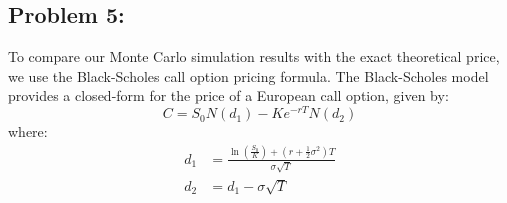 \documentclass{report}
\begin{document}
\pagebreak
\[
\]








\subsection*{Problem 5:}
To compare our Monte Carlo simulation results with the exact theoretical price, we use the Black-Scholes call option pricing formula. The Black-Scholes model provides a closed-form for the price of a European call option, given by:
\[
C=S_0N(d_1)-Ke^{-rT}N(d_2)
\]
where:
\begin{align*}
d_1 &= \frac{\ln(\frac{S_0}{K}) + (r+\frac{1}{2}\sigma^2)T}{\sigma\sqrt{T}} \\
d_2 &= d_1 -\sigma\sqrt{T}
\end{align*}
\end{document}
